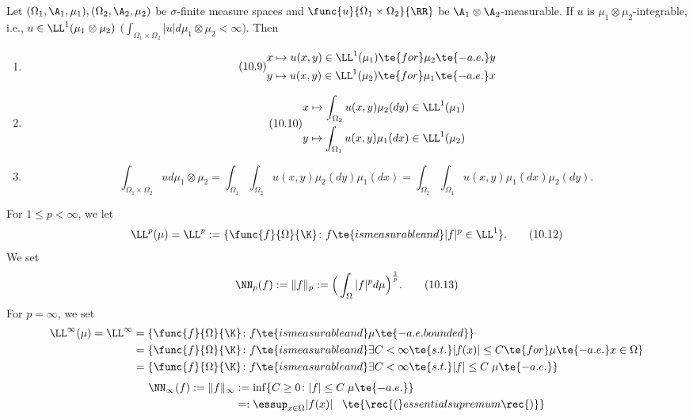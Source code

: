 \begin{thm}[Fubini]\label{x.5}
	Let $(\Omega_1,\A_1,\mu_1),(\Omega_2,\A_2,\mu_2)$ be $\sigma$-finite measure spaces and $\func{u}{\Omega_1\times\Omega_2}{\RR}$ be $\A_1\otimes\A_2$-measurable. If $u$ is $\mu_1\otimes\mu_2$-integrable, i.e., $u\in\LL^1(\mu_1\otimes\mu_2)$ $\big(\int_{\Omega_1\times\Omega_2}|u|d\mu_1\otimes\mu_2<\infty\big)$. Then
	\begin{enumerate}[label=\alph*)]
		\item \label{x.5.a}
		\begin{equation*}
			\tag{10.9}\label{10.9}
			\begin{aligned}
				x\mapsto u(x,y)\in\LL^1(\mu_1)\te{ for }\mu_2\te{-a.e. }y\\
				y\mapsto u(x,y)\in\LL^1(\mu_2)\te{ for }\mu_1\te{-a.e. }x
			\end{aligned}
		\end{equation*}
		\item \label{x.5.b}
		\begin{equation*}
			\tag{10.10}\label{10.10}
			\begin{aligned}
				x\mapsto\int_{\Omega_2}u(x,y)\mu_2(dy)\in\LL^1(\mu_1)\\
				y\mapsto\int_{\Omega_1}u(x,y)\mu_1(dx)\in\LL^1(\mu_2)
			\end{aligned}
		\end{equation*}
		\item \label{x.5.c}\[\int_{\Omega_1\times\Omega_2}ud\mu_1\otimes\mu_2=\int_{\Omega_1}\int_{\Omega_2}u(x,y)\mu_2(dy)\mu_1(dx)=\int_{\Omega_2}\int_{\Omega_1}u(x,y)\mu_1(dx)\mu_2(dy).\label{10.11}\tag{10.11}\]
	\end{enumerate}
\end{thm}

\begin{definition}\label{x.vi}
	For $1\leq p<\infty$, we let
	\[\LL^p(\mu)=\LL^p:=\{\func{f}{\Omega}{\K}\colon f\te{ is measurable and }|f|^p\in\LL^1\}.\tag{10.12}\label{10.12}\]
	We set
	\[\NN_p(f):=\|f\|_p:=\Big(\int_\Omega|f|^pd\mu\Big)^\frac{1}{p}.\tag{10.13}\label{10.13}\]
	For $p=\infty$, we set
	\begin{align*}
		\LL^\infty(\mu)=\LL^\infty&=\{\func{f}{\Omega}{\K}\colon f\te{ is measurable and }\mu\te{-a.e. bounded}\}\\
		&=\{\func{f}{\Omega}{\K}\colon f\te{ is measurable and }\exists C<\infty\te{ s.t. }|f(x)|\leq C\te{ for }\mu\te{-a.e. }x\in\Omega\}\\
		&=\{\func{f}{\Omega}{\K}\colon f\te{ is measurable and }\exists C<\infty\te{ s.t. }|f|\leq C\;\mu\te{-a.e.}\}
	\end{align*}
	\begin{align*}
		\NN_\infty(f):=\|f\|_\infty&:=\inf\{C\geq0\colon|f|\leq C\;\mu\te{-a.e.}\}\\
		&=:\essup_{x\in\Omega}|f(x)|\;\;\;\te{\rec{(}essential supremum\rec{)}}
	\end{align*}
\end{definition}

